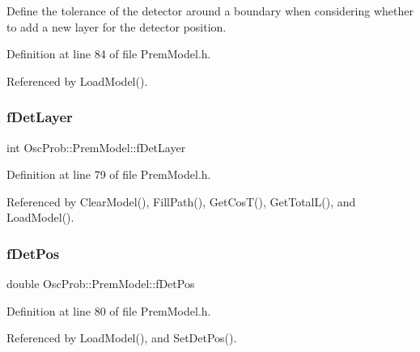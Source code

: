 Define the tolerance of the detector around a boundary when considering whether to add a new layer for the detector position. 

Definition at line 84 of file Prem\+Model.\+h.



Referenced by Load\+Model().

\mbox{\label{classOscProb_1_1PremModel_a4fb68506493666349f418b893a996185}} 
\subsubsection{\texorpdfstring{f\+Det\+Layer}{fDetLayer}}
{\footnotesize\ttfamily int Osc\+Prob\+::\+Prem\+Model\+::f\+Det\+Layer\hspace{0.3cm}{\ttfamily [protected]}}



Definition at line 79 of file Prem\+Model.\+h.



Referenced by Clear\+Model(), Fill\+Path(), Get\+Cos\+T(), Get\+Total\+L(), and Load\+Model().

\mbox{\label{classOscProb_1_1PremModel_ab12ea0343cd11b9233ffd20ab5e620c7}} 
\subsubsection{\texorpdfstring{f\+Det\+Pos}{fDetPos}}
{\footnotesize\ttfamily double Osc\+Prob\+::\+Prem\+Model\+::f\+Det\+Pos\hspace{0.3cm}{\ttfamily [protected]}}



Definition at line 80 of file Prem\+Model.\+h.



Referenced by Load\+Model(), and Set\+Det\+Pos().

\mbox{\label{classOscProb_1_1PremModel_aaf3c77e35798d664853157013c90ad2b}} 
